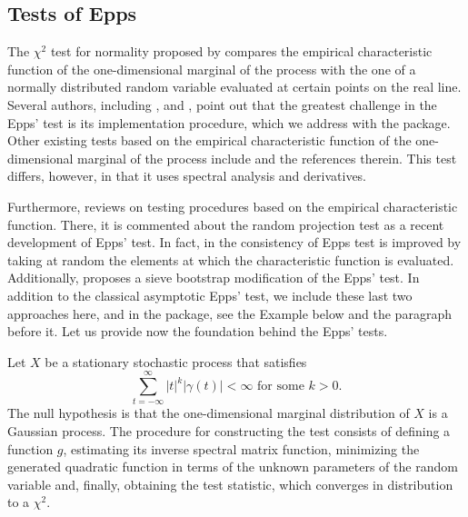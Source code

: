\subsection{Tests of Epps}\label{tests-of-epps}

The \(\chi^2\) test for normality proposed by \citet{epps1987} compares the empirical characteristic function of the one-dimensional marginal of the process with the one of a normally distributed random variable evaluated at certain points on the real line. Several authors, including \citet{Lobato2004}, \citet{vavra2017} and \citet{el2022normality}, point out that the greatest challenge in the Epps' test is its implementation procedure, which we address with the  package. Other existing tests based on the empirical characteristic function of the one-dimensional marginal of the process include \citet{hong1999hypothesis} and the references therein. This test differs, however, in that it uses spectral analysis and derivatives.

Furthermore, \citet{meintanis2016review} reviews on testing procedures based on the empirical characteristic function. There, it is commented about the random projection test \citep[and here below]{nietoreyes2014} as a recent development of Epps' test. In fact, in \citet{nietoreyes2014} the consistency of Epps test is improved by taking at random the elements at which the characteristic function is evaluated. Additionally, \citet{el2022normality} proposes a sieve bootstrap modification of the Epps' test. In addition to the classical asymptotic Epps' test, we include these last two approaches here, and in the package, see the Example below and the paragraph before it. Let us provide now the foundation behind the Epps' tests.

Let \(X\) be a stationary stochastic process that satisfies
\begin{equation}
  \sum_{t=-\infty}^{\infty}|t|^k|\gamma(t)| <\infty \mbox{ for some } k >0. \label{eq:a}
\end{equation}
The null hypothesis is that the one-dimensional marginal distribution of \(X\) is a Gaussian process. The procedure for constructing the test consists of defining a function \(g\), estimating its inverse spectral matrix function, minimizing the generated quadratic function in terms of the unknown parameters of the random variable and, finally, obtaining the test statistic, which converges in distribution to a \(\chi^2.\)

